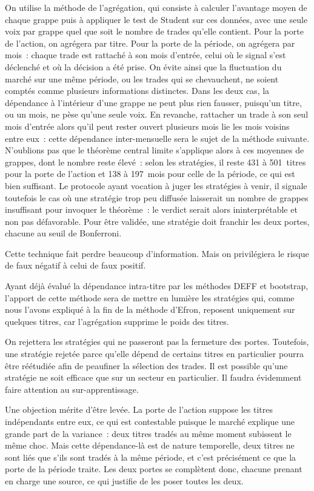 On utilise la méthode de l'agrégation, qui consiste à calculer l'avantage moyen
de chaque grappe puis à appliquer le test de Student sur ces données, avec une
seule voix par grappe quel que soit le nombre de trades qu'elle contient.
Pour la porte de l'action, on agrégera par titre. Pour la porte de la période,
on agrégera par mois~: chaque trade est rattaché à son mois d'entrée, celui où
le signal s'est déclenché et où la décision a été prise. On évite ainsi que la
fluctuation du marché sur une même période, ou les trades qui se chevauchent,
ne soient comptés comme plusieurs informations distinctes.
Dans les deux cas, la dépendance à l'intérieur d'une grappe ne peut plus rien
fausser, puisqu'un titre, ou un mois, ne pèse qu'une seule voix. En revanche,
rattacher un trade à son seul mois d'entrée alors qu'il peut rester ouvert
plusieurs mois lie les mois voisins entre eux~: cette dépendance inter-mensuelle
sera le sujet de la méthode suivante.
N'oublions pas que le théorème central limite s'applique alors à ces moyennes
de grappes, dont le nombre reste élevé~: selon les stratégies, il reste 431 à
501~titres pour la porte de l'action et 138 à 197~mois pour celle de la période,
ce qui est bien suffisant. Le protocole ayant vocation à juger les stratégies à
venir, il signale toutefois le cas où une stratégie trop peu diffusée
laisserait un nombre de grappes insuffisant pour invoquer le théorème~: le
verdict serait alors ininterprétable et non pas défavorable. Pour être validée,
une stratégie doit franchir les deux portes, chacune au seuil de Bonferroni.

Cette technique fait perdre beaucoup d'information. Mais on privilégiera
le risque de faux négatif à celui de faux positif.

Ayant déjà évalué la dépendance intra-titre par les méthodes DEFF et bootstrap,
l'apport de cette méthode sera de mettre en lumière les stratégies qui, comme
nous l'avons expliqué à la fin de la méthode d'Efron, reposent uniquement sur
quelques titres, car l'agrégation supprime le poids des titres.

On rejettera les stratégies qui ne passeront pas la fermeture des portes.
Toutefois, une stratégie rejetée parce qu'elle dépend de certains titres en
particulier pourra être réétudiée afin de peaufiner la sélection des trades.
Il est possible qu'une stratégie ne soit efficace que sur un secteur en
particulier. Il faudra évidemment faire attention au sur-apprentissage.

Une objection mérite d'être levée. La porte de l'action suppose les titres
indépendants entre eux, ce qui est contestable puisque le marché explique une
grande part de la variance~: deux titres tradés au même moment subissent le
même choc. Mais cette dépendance-là est de nature temporelle, deux titres ne
sont liés que s'ils sont tradés à la même période, et c'est précisément ce que
la porte de la période traite. Les deux portes se complètent donc, chacune
prenant en charge une source, ce qui justifie de les poser toutes les deux.

